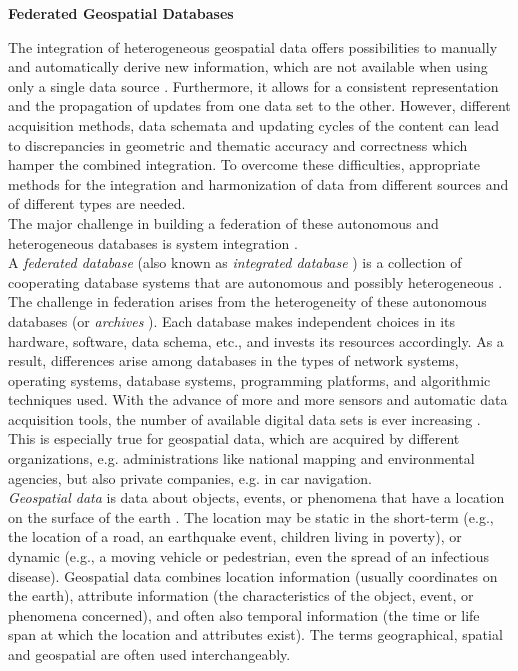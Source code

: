 \documentclass[12pt,a4paper]{report}
\newcommand{\term}{\textit}
\begin{document}
	\begin{titlepage}
		\begin{center}
			\thispagestyle{empty}
			\Large
			\textbf{Federated Geospatial Databases}
		\end{center}
	\end{titlepage}



	The integration of heterogeneous geospatial data offers possibilities to manually and automatically derive new information, which are not available when using only a single data source \citep{Butenuth}. Furthermore, it allows for a consistent representation and the propagation of updates from one data set to the other. However, different acquisition methods, data schemata and updating cycles of the content can lead to discrepancies in geometric and thematic accuracy and correctness which hamper the combined integration. To overcome these difficulties, appropriate methods for the integration and harmonization of data from different sources and of different types are needed.
	\\

	The major challenge in building a federation of these autonomous and heterogeneous databases is system integration \citep{Malik}.
	\\

	A \term{federated database} (also known as \term{integrated database} 
	\citep{Jian}) is a collection of cooperating database systems that are 
	autonomous and possibly heterogeneous \citep{Sheth}. The challenge in 
	federation arises from the heterogeneity of these autonomous databases (or 
	\term{archives} \citep{Malik}). Each  database  makes  independent choices 
	in its hardware, software, data schema, etc., and invests its resources 
	accordingly. As a result, differences arise among databases in the types of 
	network systems, operating systems, database systems, programming platforms, 
	and algorithmic techniques used. With the advance of more and more sensors 
	and automatic data acquisition tools, the number of available digital data 
	sets is ever increasing \citep{Butenuth}. This is especially true for 
	geospatial data, which are acquired by different organizations, e.g. 
	administrations like national mapping and environmental agencies, but also 
	private companies, e.g. in car navigation.
	\\

	\term{Geospatial data} is data about objects, events, or phenomena that have a location on the surface of the earth \citep{Stock}. The location may be 
	static in the short-term (e.g., the location of a road, an earthquake event, children living in poverty), or dynamic (e.g., a moving vehicle or pedestrian, even the spread of an infectious disease). Geospatial data combines location information (usually coordinates on the earth), attribute information (the characteristics of the object, event, or phenomena concerned), and often also temporal information (the time or life span at which the location and attributes exist). The terms geographical, spatial and geospatial are often used interchangeably.
	\\
\end{document}
